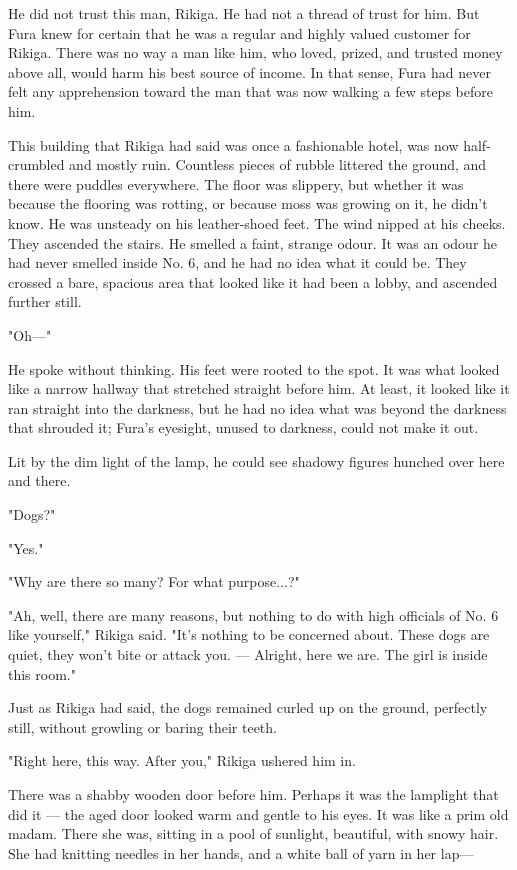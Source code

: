He did not trust this man, Rikiga. He had not a thread of trust for him.
But Fura knew for certain that he was a regular and highly valued
customer for Rikiga. There was no way a man like him, who loved, prized,
and trusted money above all, would harm his best source of income. In
that sense, Fura had never felt any apprehension toward the man that was
now walking a few steps before him.

This building that Rikiga had said was once a fashionable hotel, was now
half-crumbled and mostly ruin. Countless pieces of rubble littered the
ground, and there were puddles everywhere. The floor was slippery, but
whether it was because the flooring was rotting, or because moss was
growing on it, he didn't know. He was unsteady on his leather-shoed
feet. The wind nipped at his cheeks. They ascended the stairs. He
smelled a faint, strange odour. It was an odour he had never smelled
inside No. 6, and he had no idea what it could be. They crossed a bare,
spacious area that looked like it had been a lobby, and ascended further
still.

"Oh---"

He spoke without thinking. His feet were rooted to the spot. It was what
looked like a narrow hallway that stretched straight before him. At
least, it looked like it ran straight into the darkness, but he had no
idea what was beyond the darkness that shrouded it; Fura's eyesight,
unused to darkness, could not make it out.

Lit by the dim light of the lamp, he could see shadowy figures hunched
over here and there.

"Dogs?"

"Yes."

"Why are there so many? For what purpose...?"

"Ah, well, there are many reasons, but nothing to do with high officials
of No. 6 like yourself," Rikiga said. "It's nothing to be concerned
about. These dogs are quiet, they won't bite or attack you. --- Alright,
here we are. The girl is inside this room."

Just as Rikiga had said, the dogs remained curled up on the ground,
perfectly still, without growling or baring their teeth.

"Right here, this way. After you," Rikiga ushered him in.

There was a shabby wooden door before him. Perhaps it was the lamplight
that did it --- the aged door looked warm and gentle to his eyes. It was
like a prim old madam. There she was, sitting in a pool of sunlight,
beautiful, with snowy hair. She had knitting needles in her hands, and a
white ball of yarn in her lap---

